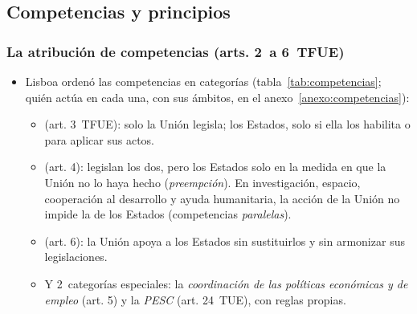 \documentclass[11pt]{article}
\begin{document}
\subsection{Competencias y principios}\label{sec:competencias}

\subsubsection{La atribución de competencias (arts. 2~a 6~TFUE)}\label{sec:atribucion}

\begin{itemize}
\item Lisboa ordenó las competencias en categorías (tabla~\ref{tab:competencias}; quién actúa en cada una, con sus ámbitos, en el anexo~\ref{anexo:competencias}):
  \begin{itemize}
  \item {} (art. 3~TFUE): solo la Unión legisla; los Estados, solo si ella los habilita o para aplicar sus actos.
  \item {} (art. 4): legislan los dos, pero los Estados solo en la medida en que la Unión no lo haya hecho (\emph{preempción}). En investigación, espacio, cooperación al desarrollo y ayuda humanitaria, la acción de la Unión no impide la de los Estados (competencias \emph{paralelas}).
  \item {} (art. 6): la Unión apoya a los Estados sin sustituirlos y sin armonizar sus legislaciones.
  \item Y 2~categorías especiales: la \emph{coordinación de las políticas económicas y de empleo} (art. 5) y la \emph{PESC} (art. 24~TUE), con reglas propias.
  \end{itemize}
\end{itemize}
\end{document}
